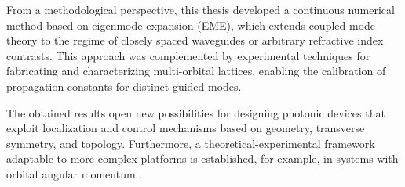 From a methodological perspective, this thesis developed a continuous numerical method based on eigenmode expansion (EME), which extends coupled-mode theory to the regime of closely spaced waveguides or arbitrary refractive index contrasts. This approach was complemented by experimental techniques for fabricating and characterizing multi-orbital lattices, enabling the calibration of propagation constants for distinct guided modes.

The obtained results open new possibilities for designing photonic devices that exploit localization and control mechanisms based on geometry, transverse symmetry, and topology. Furthermore, a theoretical-experimental framework adaptable to more complex platforms is established, for example, in systems with orbital angular momentum \citep{OAMCaging}.

